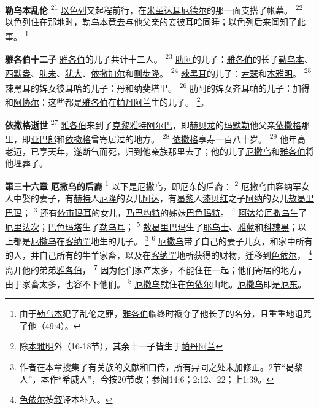 \textbf{勒乌本乱伦 }
\textsuperscript{21}
\uline{以色列}又起程前行，在\uline{米革}\uline{达耳}\uline{厄德尔}的那一面支搭了帐幕。
\textsuperscript{22}
\uline{以色列}住在那地时，\uline{勒乌本}竟去与他父亲的妾\uline{彼耳哈}同睡；\uline{以色列}后来闻知了此事。
\footnote{由于\uline{勒乌本}犯了乱伦之罪，\uline{雅各伯}临终时禠夺了他长子的名分，且重重地诅咒了他（49:4）。}

\textbf{雅各伯十二子 }
\uline{雅各伯}的儿子共计十二人。
\textsuperscript{23}
\uline{肋阿}的儿子：\uline{雅各伯}的长子\uline{勒乌本}、\uline{西默盎}、\uline{肋未}、\uline{犹大}、\uline{依撒}\uline{加尔}和\uline{则步隆}。
\textsuperscript{24}
\uline{辣黑耳}的儿子：\uline{若瑟}和\uline{本雅明}。
\textsuperscript{25}
\uline{辣黑耳}的婢女\uline{彼耳哈}的儿子：\uline{丹}和\uline{纳斐塔里}。
\textsuperscript{26}
\uline{肋阿}的婢女\uline{齐耳帕}的儿子：\uline{加得}和\uline{阿协尔}：这些都是\uline{雅各伯}在\uline{帕丹}\uline{阿兰}生的儿子。
\footnote{除\uline{本雅明}外（16-18节），其余十一子皆生于\uline{帕丹}\uline{阿兰}}。

\textbf{依撒格逝世 }
\textsuperscript{27}
\uline{雅各伯}来到了\uline{克黎}\uline{雅特}\uline{阿尔巴}，即\uline{赫贝龙}的\uline{玛默勒}他父亲\uline{依撒格}那里，即\uline{亚巴郎}和\uline{依撒格}曾寄居过的地方。
\textsuperscript{28}
\uline{依撒格}享寿一百八十岁。
\textsuperscript{29}
他年高老迈，已享天年，遂断气而死，归到他亲族那里去了；他的儿子\uline{厄撒乌}和\uline{雅各伯}将他埋葬了。

\textbf{第三十六章 }
\textbf{厄撒乌的后裔 }
\textsuperscript{1}
以下是\uline{厄撒乌}，即\uline{厄东}的后裔：
\textsuperscript{2}
\uline{厄撒乌}由\uline{客纳罕}女人中娶的妻子，有\uline{赫特}人\uline{厄隆}的女儿\uline{阿达}，有\uline{曷黎}人\uline{漆贝红}之子\uline{阿纳}的女儿\uline{敖曷里}\uline{巴玛}；
\textsuperscript{3}
还有\uline{依市}\uline{玛耳}的女儿，\uline{乃巴}\uline{约特}的姊妹\uline{巴色}\uline{玛特}。
\textsuperscript{4}
\uline{阿达}给\uline{厄撒乌}生了\uline{厄里}\uline{法次}；\uline{巴色}\uline{玛塔}生了\uline{勒乌耳}；
\textsuperscript{5}
\uline{敖曷里}\uline{巴玛}生了\uline{耶乌士}、\uline{雅蓝}和\uline{科辣黑}；以上都是\uline{厄撒乌}在\uline{客纳罕}地生的儿子。
\footnote{作者在本章搜集了有关族的文献和口传，所有异同之处未加修正。2节“曷黎人”，本作“希威人”，今按20节改；参阅14:6；2:12、22；上1:39。}
\textsuperscript{6}
\uline{厄撒乌}带了自己的妻子儿女，和家中所有的人，并自己所有的牛羊家畜，以及在\uline{客纳罕}地所获得的财物，迁移到\uline{色依尔}，
\footnote{\uline{色依尔}按\uline{叙}译本补入。}
离开他的弟弟\uline{雅各伯}，
\textsuperscript{7}
因为他们家产太多，不能住在一起；他们寄居的地方，由于家畜太多，也容不下他们。
\textsuperscript{8}
\uline{厄撒乌}就住在\uline{色依尔}山地。\uline{厄撒乌}即是\uline{厄东}。

